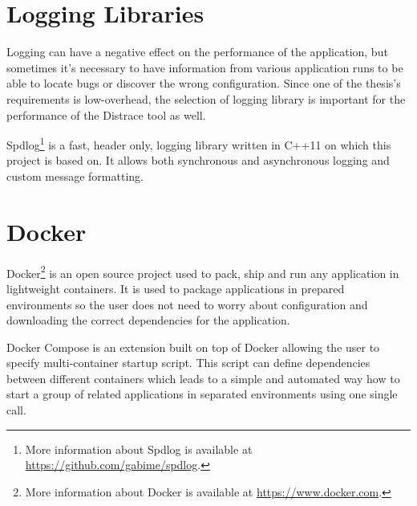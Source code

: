 \section{Logging Libraries}
Logging can have a negative effect on the performance of the application, but sometimes it's necessary to have information from various application runs to be able to locate bugs or discover the wrong configuration. Since one of the thesis's requirements is low-overhead, the selection of logging library is important for the performance of the Distrace tool as well. 

Spdlog\footnote{More information about Spdlog is available at \url{https://github.com/gabime/spdlog}.} is a fast, header only, logging library written in C++11 on which this project is based on. It allows both synchronous and asynchronous logging and custom message formatting.
\section{Docker}
Docker\footnote{More information about Docker is available at \url{https://www.docker.com}.} is an open source project used to pack, ship and run any application in lightweight containers. It is used to package applications in prepared environments so the user does not need to worry about configuration and downloading the correct dependencies for the application. 

Docker Compose is an extension built on top of Docker allowing the user to specify multi-container startup script. This script can define dependencies between different containers which leads to a simple and automated way how to start a group of related applications in separated environments using one single call. 

